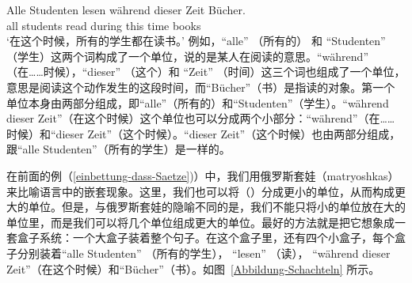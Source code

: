 \ea
\label{Beispiel-Alle-Studenten-lesen}
\gll Alle Studenten lesen während dieser Zeit Bücher.\\
     all  students  read  during  this   time books\\
\glt `在这个时候，所有的学生都在读书。'
\z
例如，“alle” （所有的） 和 “Studenten” （学生）这两个词构成了一个单位，说的是某人在阅读的意思。“während” （在……时候），“dieser” （这个）和 “Zeit” （时间）这三个词也组成了一个单位，意思是阅读这个动作发生的这段时间，而“Bücher”（书）是指读的对象。第一个单位本身由两部分组成，即“alle”（所有的）和“Studenten”（学生）。“während dieser Zeit”（在这个时候）这个单位也可以分成两个小部分：“während”（在……时候）和“dieser Zeit”（这个时候）。“dieser Zeit”（这个时候）也由两部分组成，跟“alle Studenten”（所有的学生）是一样的。

在前面的例（\ref{einbettung-dass-Saetze})）中，我们用俄罗斯套娃（matryoshkas）来比喻语言中的嵌套现象。这里，我们也可以将（）分成更小的单位，从而构成更大的单位。但是，与俄罗斯套娃的隐喻不同的是，我们不能只将小的单位放在大的单位里，而是我们可以将几个单位组成更大的单位。最好的方法就是把它想象成一套盒子系统：一个大盒子装着整个句子。在这个盒子里，还有四个小盒子，每个盒子分别装着“alle Studenten” （所有的学生）， “lesen” （读）， “während dieser Zeit”（在这个时候）和“Bücher”（书）。如图~\vref{Abbildung-Schachteln} 所示。

